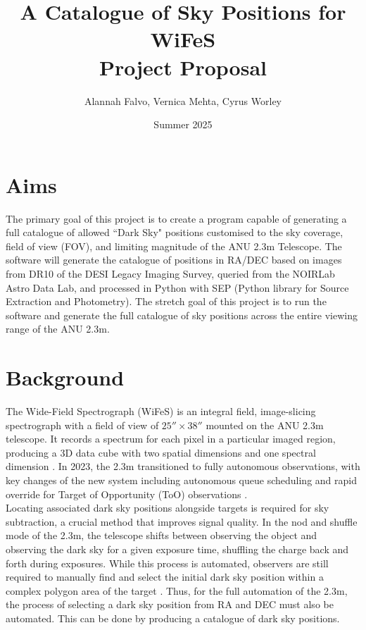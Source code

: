 \documentclass[11pt]{article}
\title{%
    \huge A Catalogue of Sky Positions for WiFeS \\
    \Large \textbf{Project Proposal}}
\author{Alannah Falvo, Vernica Mehta, Cyrus Worley}
\date{Summer 2025}
\begin{document}
\maketitle

\section{Aims}
The primary goal of this project is to create a program capable of generating a full catalogue of allowed ``Dark Sky" positions customised to the sky coverage, field of view (FOV), and limiting magnitude of the ANU 2.3m Telescope. The software will generate the catalogue of positions in RA/DEC based on images from DR10 of the DESI Legacy Imaging Survey, queried from the NOIRLab Astro Data Lab, and processed in Python with SEP (Python library for Source Extraction and Photometry)\cite{bertin_sextractor_1996}\cite{barbary_sep_2016}. The stretch goal of this project is to run the software and generate the full catalogue of sky positions across the entire viewing range of the ANU 2.3m. 

\section{Background}

The Wide-Field Spectrograph (WiFeS) is an integral field, image-slicing spectrograph with a field of view of $25''\times38''$ mounted on the ANU 2.3m telescope. It records a spectrum for each pixel in a particular imaged region, producing a 3D data cube with two spatial dimensions and one spectral dimension \cite{dopita_wide_2007}.  In 2023, the 2.3m transitioned to fully autonomous observations, with key changes of the new system including autonomous queue scheduling and rapid override for Target of Opportunity (ToO) observations \cite{price_converting_2024}. \\

Locating associated dark sky positions alongside targets is required for sky subtraction, a crucial method that improves signal quality. In the nod and shuffle mode of the 2.3m, the telescope shifts between observing the object and observing the dark sky for a given exposure time, shuffling the charge back and forth during exposures. While this process is automated, observers are still required to manually find and select the initial dark sky position within a complex polygon area of the target \cite{dopita_wide_2007}. Thus, for the full automation of the 2.3m, the process of selecting a dark sky position from RA and DEC must also be automated. This can be done by producing a catalogue of dark sky positions. 
\end{document}
